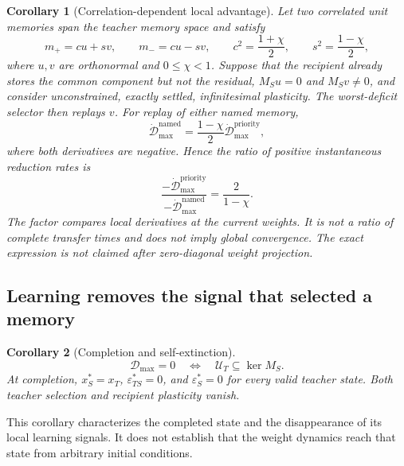 \documentclass[10pt,letterpaper]{article}
\theoremstyle{plain}
\newtheorem{corollary}{Corollary}
\theoremstyle{remark}
\begin{document}
\begin{corollary}[Correlation-dependent local advantage]
\label{cor:correlated-local}
Let two correlated unit memories span the teacher memory space and satisfy
\begin{equation}
m_+=cu+sv,
\qquad
m_-=cu-sv,
\qquad
c^2=\frac{1+\chi}{2},
\qquad
s^2=\frac{1-\chi}{2},
\end{equation}
where $u,v$ are orthonormal and $0\leq\chi<1$. Suppose that the recipient already stores the common component but not the residual, $M_Su=0$ and $M_Sv\neq0$, and consider unconstrained, exactly settled, infinitesimal plasticity. The worst-deficit selector then replays $v$. For replay of either named memory,
\begin{equation}
\dot{\mathcal D}_{\max}^{\mathrm{named}}
=
\frac{1-\chi}{2}
\dot{\mathcal D}_{\max}^{\mathrm{priority}},
\end{equation}
where both derivatives are negative. Hence the ratio of positive instantaneous reduction rates is
\begin{equation}
\boxed{
\frac{-\dot{\mathcal D}_{\max}^{\mathrm{priority}}}
{-\dot{\mathcal D}_{\max}^{\mathrm{named}}}
=
\frac{2}{1-\chi}.
}
\label{eq:local-correlation-speedup}
\end{equation}
The factor compares local derivatives at the current weights. It is not a ratio of complete transfer times and does not imply global convergence. The exact expression is not claimed after zero-diagonal weight projection.
\end{corollary}

\subsection{Learning removes the signal that selected a memory}

\begin{corollary}[Completion and self-extinction]
\label{cor:self-extinction}
\begin{equation}
\mathcal D_{\max}=0
\quad\Longleftrightarrow\quad
\mathcal U_T\subseteq\ker M_S.
\end{equation}
At completion, $x_S^*=x_T$, $\varepsilon_{TS}^*=0$, and $\varepsilon_S^*=0$ for every valid teacher state. Both teacher selection and recipient plasticity vanish.
\end{corollary}

This corollary characterizes the completed state and the disappearance of its local learning signals. It does not establish that the weight dynamics reach that state from arbitrary initial conditions.
\end{document}
